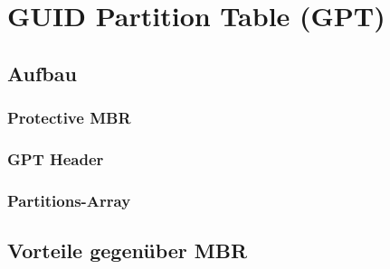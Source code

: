 \section{GUID Partition Table (GPT)}
\label{sec:structure}

\subsection{Aufbau}

\subsubsection{Protective MBR}

\subsubsection{GPT Header}

\subsubsection{Partitions-Array}

\subsection{Vorteile gegenüber MBR}
\label{sec:gpt:advantages}

